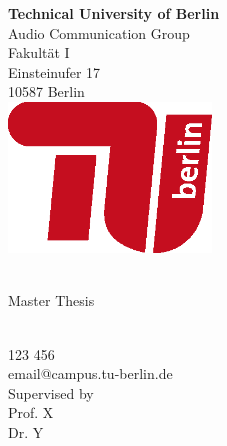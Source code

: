 \begin{titlepage}
	\makeatletter
	\centering
	{\LARGE \textbf{Technical University of Berlin}}\\
	\vspace*{.7cm}
	{\large Audio Communication Group}\\
	\vspace*{.7cm}
	Fakultät I\\
	Einsteinufer 17\\
	10587 Berlin\\
	
	\vspace*{2.5cm}
	\includegraphics[height=4cm]{Graphics/TU_Logo_kurz_RGB_rot}\\
	\vspace*{2.5cm}
	
	{\Large \textbf{\@title}}\\
	\vspace*{.7cm}
	{\large Master Thesis}\\
	\vspace*{.5cm}
	
	\@author \\
	123 456\\
	email@campus.tu-berlin.de\\
	\vspace*{.5cm}
	Supervised by\\
	Prof. X\\
	Dr. Y
	\makeatother
\end{titlepage}